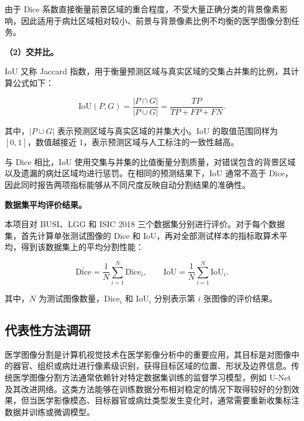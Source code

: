 \documentclass[10.5pt,compsoc]{CjC}
\theoremstyle{mystyle}
\begin{document}
由于 Dice 系数直接衡量前景区域的重合程度，不受大量正确分类的背景像素影响，因此适用于病灶区域相对较小、前景与背景像素比例不均衡的医学图像分割任务。

\noindent\textbf{（2）交并比。}

IoU 又称 Jaccard 指数，用于衡量预测区域与真实区域的交集占并集的比例，其计算公式如下：

\begin{equation}
\mathrm{IoU}(P,G)
=
\frac{|P\cap G|}{|P\cup G|}
=
\frac{TP}{TP+FP+FN}.
\label{eq:iou}
\end{equation}

其中，$|P\cup G|$ 表示预测区域与真实区域的并集大小。IoU 的取值范围同样为 $[0,1]$，数值越接近 1，表示预测区域与人工标注的一致性越高。

与 Dice 相比，IoU 使用交集与并集的比值衡量分割质量，对错误包含的背景区域以及遗漏的病灶区域均进行惩罚。在相同的预测结果下，IoU 通常不高于 Dice，因此同时报告两项指标能够从不同尺度反映自动分割结果的准确性。

\noindent\textbf{数据集平均评价结果。}

本项目对 BUSI、LGG 和 ISIC 2018 三个数据集分别进行评价。对于每个数据集，首先计算单张测试图像的 Dice 和 IoU，再对全部测试样本的指标取算术平均，得到该数据集上的平均分割性能：

\begin{equation}
\overline{\mathrm{Dice}}
=
\frac{1}{N}
\sum_{i=1}^{N}\mathrm{Dice}_i,
\qquad
\overline{\mathrm{IoU}}
=
\frac{1}{N}
\sum_{i=1}^{N}\mathrm{IoU}_i.
\label{eq:mean_metrics}
\end{equation}

其中，$N$ 为测试图像数量，$\mathrm{Dice}_i$ 和 $\mathrm{IoU}_i$ 分别表示第 $i$ 张图像的评价结果。











\subsection{代表性方法调研}

医学图像分割是计算机视觉技术在医学影像分析中的重要应用，其目标是对图像中的器官、组织或病灶进行像素级识别，获得目标区域的位置、形状及边界信息。传统医学图像分割方法通常依赖针对特定数据集训练的监督学习模型，例如 U-Net 及其改进网络。这类方法能够在训练数据分布相对稳定的情况下取得较好的分割效果，但当医学影像模态、目标器官或病灶类型发生变化时，通常需要重新收集标注数据并训练或微调模型。
\end{document}
